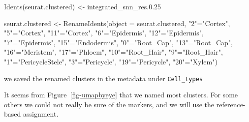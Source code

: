 \documentclass[
  letterpaper,
  DIV=11,
  numbers=noendperiod]{scrartcl}
\newenvironment{Shaded}{\begin{snugshade}}{\end{snugshade}}
\newcommand{\AttributeTok}[1]{\textcolor[rgb]{0.49,0.56,0.16}{#1}}
\newcommand{\FunctionTok}[1]{\textcolor[rgb]{0.02,0.16,0.49}{#1}}
\newcommand{\NormalTok}[1]{\textcolor[rgb]{0.00,0.44,0.13}{#1}}
\newcommand{\OtherTok}[1]{\textcolor[rgb]{0.00,0.44,0.13}{#1}}
\newcommand{\SpecialCharTok}[1]{\textcolor[rgb]{0.25,0.44,0.63}{#1}}
\newcommand{\StringTok}[1]{\textcolor[rgb]{0.25,0.44,0.63}{#1}}
\begin{document}
\begin{Shaded}
\begin{Highlighting}[]
\FunctionTok{Idents}\NormalTok{(seurat.clustered) }\OtherTok{\textless{}{-}} \StringTok{\textquotesingle{}integrated\_snn\_res.0.25\textquotesingle{}}

\NormalTok{seurat.clustered }\OtherTok{\textless{}{-}} \FunctionTok{RenameIdents}\NormalTok{(}\AttributeTok{object =}\NormalTok{ seurat.clustered,}
                               \StringTok{"2"}\OtherTok{=}\StringTok{"Cortex"}\NormalTok{, }\StringTok{"5"}\OtherTok{=}\StringTok{"Cortex"}\NormalTok{, }\StringTok{"11"}\OtherTok{=}\StringTok{"Cortex"}\NormalTok{,}
                               \StringTok{"6"}\OtherTok{=}\StringTok{"Epidermis"}\NormalTok{, }\StringTok{"12"}\OtherTok{=}\StringTok{"Epidermis"}\NormalTok{, }\StringTok{"7"}\OtherTok{=}\StringTok{"Epidermis"}\NormalTok{,}
                               \StringTok{"15"}\OtherTok{=}\StringTok{"Endodermis"}\NormalTok{,  }
                               \StringTok{"0"}\OtherTok{=}\StringTok{"Root\_Cap"}\NormalTok{, }\StringTok{"13"}\OtherTok{=}\StringTok{"Root\_Cap"}\NormalTok{,}
                               \StringTok{"16"}\OtherTok{=}\StringTok{"Meristem"}\NormalTok{,  }
                               \StringTok{"17"}\OtherTok{=}\StringTok{"Phloem"}\NormalTok{,}
                               \StringTok{"10"}\OtherTok{=}\StringTok{"Root\_Hair"}\NormalTok{, }\StringTok{"9"}\OtherTok{=}\StringTok{"Root\_Hair"}\NormalTok{,}
                               \StringTok{"1"}\OtherTok{=}\StringTok{"PericycleStele"}\NormalTok{, }
                               \StringTok{"3"}\OtherTok{=}\StringTok{"Pericycle"}\NormalTok{, }\StringTok{"19"}\OtherTok{=}\StringTok{"Pericycle"}\NormalTok{,}
                               \StringTok{"20"}\OtherTok{=}\StringTok{"Xylem"}\NormalTok{)}
\end{Highlighting}
\end{Shaded}

we saved the renamed clusters in the metadata under \texttt{Cell\_types}

\begin{Shaded}
\end{Shaded}

It seems from Figure~\ref{fig-umapbyeye} that we named most clusters.
For some others we could not really be sure of the markers, and we will
use the reference-based assignment.
\end{document}
